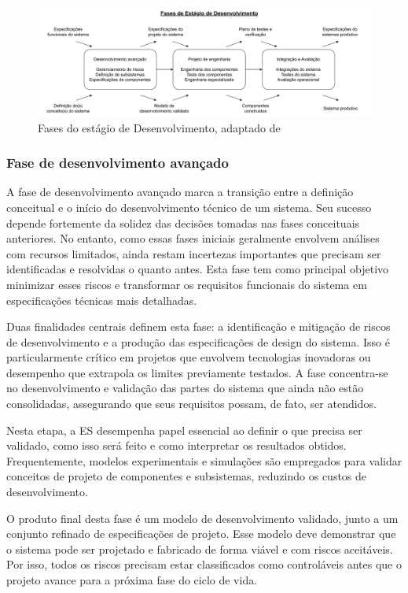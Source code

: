 	\begin{figure}[h]
		\centering
		\includegraphics[width=\textwidth]{./figuras/developmentPhases.pdf}
		\caption{Fases do estágio de Desenvolvimento, adaptado de \citep{kossiakoff2020systems}}
		\label{fig:revisao:developmentStagePhases}
	\end{figure}


	\subsubsection*{Fase de desenvolvimento avançado}
	A fase de desenvolvimento avançado marca a transição entre a definição conceitual e o início do desenvolvimento técnico de um sistema. Seu sucesso depende 
	fortemente da solidez das decisões tomadas nas fases conceituais anteriores. No entanto, como essas fases iniciais geralmente envolvem análises com recursos 
	limitados, ainda restam incertezas importantes que precisam ser identificadas e resolvidas o quanto antes. Esta fase tem como principal objetivo minimizar 
	esses riscos e transformar os requisitos funcionais do sistema em especificações técnicas mais detalhadas.

	Duas finalidades centrais definem esta fase: a identificação e mitigação de riscos de desenvolvimento e a produção das especificações de design do sistema. 
	Isso é particularmente crítico em projetos que envolvem tecnologias inovadoras ou desempenho que extrapola os limites previamente testados. A fase 
	concentra-se no desenvolvimento e validação das partes do sistema que ainda não estão consolidadas, assegurando que seus requisitos possam, de fato, ser 
	atendidos.

	Nesta etapa, a ES desempenha papel essencial ao definir o que precisa ser validado, como isso será feito e como interpretar os resultados 
	obtidos. Frequentemente, modelos experimentais e simulações são empregados para validar conceitos de projeto de componentes e subsistemas, reduzindo os custos 
	de desenvolvimento.

	O produto final desta fase é um modelo de desenvolvimento validado, junto a um conjunto refinado de especificações de projeto. Esse modelo deve demonstrar que
	o sistema pode ser projetado e fabricado de forma viável e com riscos aceitáveis. Por isso, todos os riscos precisam estar classificados como controláveis 
	antes que o projeto avance para a próxima fase do ciclo de vida.

